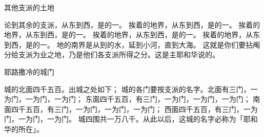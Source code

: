 {\par }{\SH 其他支派的土地
\par }{\PP {}论到其余的支派，从东到西，是{}的一{}。
挨着{}的地界，从东到西，是{}的一{}。
挨着{}的地界，从东到西，是{}的一{}。
挨着{}的地界，从东到西，是{}的一{}。
挨着{}的地界，从东到西，是{}的一{}。
地的南界是从{}到{}的水，延到{}小河，直到大海。
这就是你们要拈阄分给{}支派为业之地，乃是他们各支派所得之分。这是主耶和华说的。
\par }{\SH 耶路撒冷的城门
\par }{\PP {}城的北面四千五百{}。出城之处如下；
城的各门要按{}支派的名字。北面有三门，一为{}门，一为{}门，一为{}门；
东面四千五百{}，有三门，一为{}门，一为{}门，一为{}门；
南面四千五百{}，有三门，一为{}门，一为{}门，一为{}门；
西面四千五百{}，有三门，一为{}门，一为{}门，一为{}门。
城四围共一万八千{}。从此以后，这城的名字必称为「耶和华的所在」。
\par }